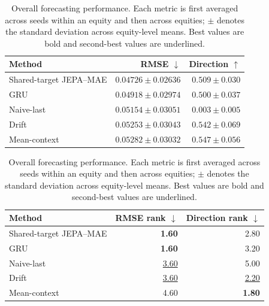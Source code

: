 \begin{table}[t]
\centering
\small
\caption{Overall forecasting performance. Each metric is first averaged across seeds within an equity and then across equities; $\pm$ denotes the standard deviation across equity-level means. Best values are bold and second-best values are underlined.}
\label{tab:main_metrics}
\begin{tabular}{lrr}
\toprule
Method & RMSE $\downarrow$ & Direction $\uparrow$ \\
\midrule
Shared-target JEPA--MAE & \textbf{$0.04726 \pm 0.02636$} & $0.509 \pm 0.030$ \\
GRU & \underline{$0.04918 \pm 0.02974$} & $0.500 \pm 0.037$ \\
Naive-last & $0.05154 \pm 0.03051$ & $0.003 \pm 0.005$ \\
Drift & $0.05253 \pm 0.03043$ & \underline{$0.542 \pm 0.069$} \\
Mean-context & $0.05282 \pm 0.03032$ & \textbf{$0.547 \pm 0.056$} \\
\bottomrule
\end{tabular}
\par\medskip
\begin{tabular}{lrr}
\toprule
Method & RMSE rank $\downarrow$ & Direction rank $\downarrow$ \\
\midrule
Shared-target JEPA--MAE & \textbf{1.60} & 2.80 \\
GRU & \textbf{1.60} & 3.20 \\
Naive-last & \underline{3.60} & 5.00 \\
Drift & \underline{3.60} & \underline{2.20} \\
Mean-context & 4.60 & \textbf{1.80} \\
\bottomrule
\end{tabular}
\end{table}
